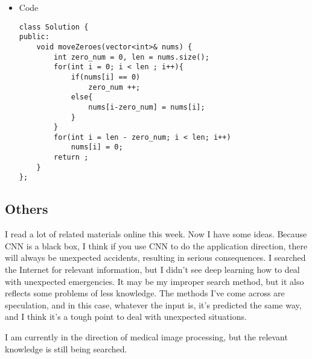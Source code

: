\documentclass[UTF8]{ctexart}
\begin{document}
\begin{itemize}
        \item Code
        \begin{lstlisting}
class Solution {
public:
    void moveZeroes(vector<int>& nums) {
        int zero_num = 0, len = nums.size();
        for(int i = 0; i < len ; i++){
            if(nums[i] == 0)
                zero_num ++;
            else{
                nums[i-zero_num] = nums[i];
            }
        }
        for(int i = len - zero_num; i < len; i++)
            nums[i] = 0;
        return ;
    }
};
        \end{lstlisting}
    \end{itemize}

    \begin{center}
        \section*{Others}
    \end{center}
    \begin{flushleft}
        I read a lot of related materials online this week. Now I have some ideas. Because CNN is a black box, I think if you use CNN to do the application direction, there will always be unexpected accidents, resulting in serious consequences. I searched the Internet for relevant information, but I didn't see deep learning how to deal with unexpected emergencies. It may be my improper search method, but it also reflects some problems of less knowledge. The methods I've come across are speculation, and in this case, whatever the input is, it's predicted the same way, and I think it's a tough point to deal with unexpected situations. 

        
        I am currently in the direction of medical image processing, but the relevant knowledge is still being searched.
    \end{flushleft}
\end{document}
